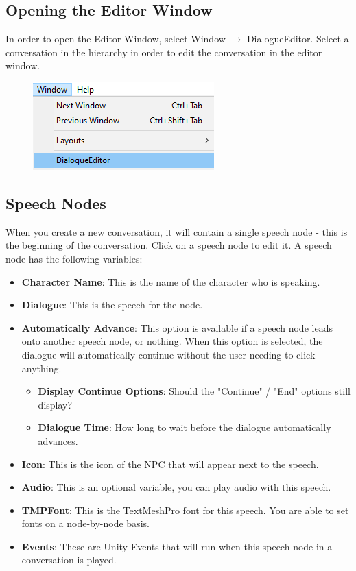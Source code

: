 \documentclass[a4paper,12pt]{article}
\begin{document}
\subsection{Opening the Editor Window}
In order to open the Editor Window, select Window $\rightarrow$ DialogueEditor. Select a conversation in the hierarchy in order to edit the conversation in the editor window.

\begin{figure}[ht]
\centering
\includegraphics[keepaspectratio]{img/OpenEditorWindow.png}
\end{figure}

\subsection{Speech Nodes}
When you create a new conversation, it will contain a single speech node - this is the beginning of the conversation. 
\newline
Click on a speech node to edit it. A speech node has the following variables:

\begin{itemize}
\setlength\itemsep{1pt}
	\item \textbf{Character Name}: This is the name of the character who is speaking.
	\item \textbf{Dialogue}: This is the speech for the node.
	\item \textbf{Automatically Advance}: This option is available if a speech node leads onto another speech node, or nothing. When this option is selected, the dialogue will automatically continue without the user needing to click anything.
	\begin{itemize}
		\item \textbf{Display Continue Options}: Should the "Continue" / "End" options still display?
		\item \textbf{Dialogue Time}: How long to wait before the dialogue automatically advances.
	\end{itemize}
	\item \textbf{Icon}: This is the icon of the NPC that will appear next to the speech.
	\item \textbf{Audio}: This is an optional variable, you can play audio with this speech.
	\item \textbf{TMPFont}: This is the TextMeshPro font for this speech. You are able to set fonts on a node-by-node basis.
	\item \textbf{Events}: These are Unity Events that will run when this speech node in a conversation is played.
\end{itemize}
\end{document}
